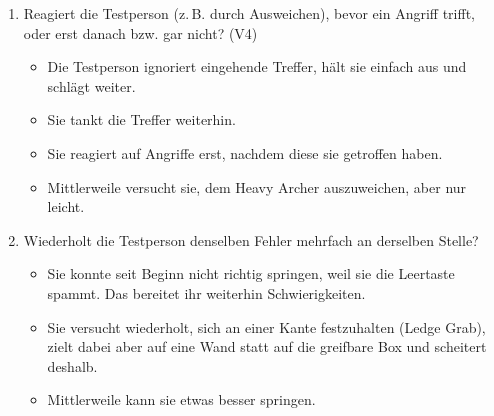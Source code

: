 \documentclass[../Main.tex]{subfiles}
\begin{document}
\begin{enumerate}[label=\textbf{B\arabic*}, leftmargin=1.5cm, itemsep=0.8em]
    \item Reagiert die Testperson (z.\,B. durch Ausweichen), bevor ein Angriff trifft, oder erst danach bzw. gar nicht? \hfill (V4)
    \begin{itemize}[nosep]
        \item Die Testperson ignoriert eingehende Treffer, hält sie einfach aus und schlägt weiter.
        \item Sie tankt die Treffer weiterhin.
        \item Sie reagiert auf Angriffe erst, nachdem diese sie getroffen haben.
        \item Mittlerweile versucht sie, dem Heavy Archer auszuweichen, aber nur leicht.
    \end{itemize}

    \item Wiederholt die Testperson denselben Fehler mehrfach an derselben Stelle?
    \begin{itemize}[nosep]
        \item Sie konnte seit Beginn nicht richtig springen, weil sie die Leertaste spammt. Das bereitet ihr weiterhin Schwierigkeiten.
        \item Sie versucht wiederholt, sich an einer Kante festzuhalten (Ledge Grab), zielt dabei aber auf eine Wand statt auf die greifbare Box und scheitert deshalb.
        \item Mittlerweile kann sie etwas besser springen.
    \end{itemize}
\end{enumerate}
\end{document}
